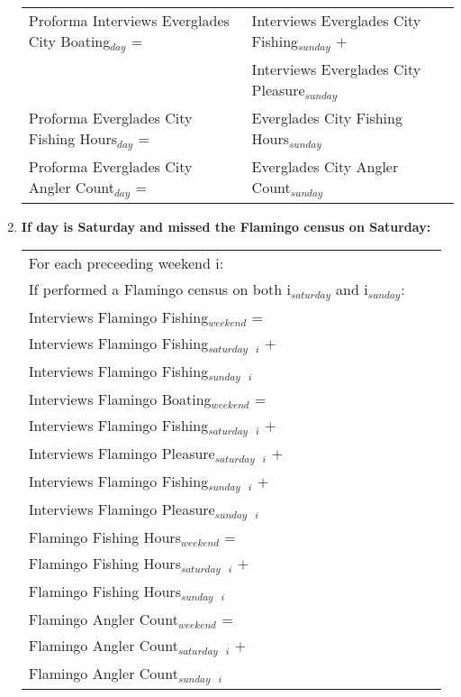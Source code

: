 \documentclass[letterpaper,12pt]{article}
\newcommand{\hspacer}{\hspace*{1cm}}
\begin{document}
\begin{enumerate}
\begin{tabular}{l@{ }l@{ }l}
	Proforma Interviews Everglades City Boating$_{day}$ =
		& Interviews Everglades City Fishing$_{sunday}$ $+$ \\
		& Interviews Everglades City Pleasure$_{sunday}$ \\

	Proforma Everglades City Fishing Hours$_{day}$ =
		& Everglades City Fishing Hours$_{sunday}$ \\

	Proforma Everglades City Angler Count$_{day}$ =
		& Everglades City Angler Count$_{sunday}$ \\
\end{tabular}

\item
\textbf{If day is Saturday and missed the Flamingo census on Saturday:} \\
\begin{tabular}{l@{ }l@{ }l}
	For each preceeding weekend i: \\
\hspacer If performed a Flamingo census on both i$_{saturday}$ and i$_{sunday}$: \\
\hspacer \hspacer Interviews Flamingo Fishing$_{weekend}$ = \\
\hspacer \hspacer \hspacer Interviews Flamingo Fishing$_{saturday}$\ $_{i}$ $+$ \\
\hspacer \hspacer \hspacer Interviews Flamingo Fishing$_{sunday}$\ $_{i}$ \\

\hspacer \hspacer Interviews Flamingo Boating$_{weekend}$ = \\
\hspacer \hspacer \hspacer Interviews Flamingo Fishing$_{saturday}$\ $_{i}$ $+$ \\
\hspacer \hspacer \hspacer Interviews Flamingo Pleasure$_{saturday}$\ $_{i}$ $+$ \\
\hspacer \hspacer \hspacer Interviews Flamingo Fishing$_{sunday}$\ $_{i}$ $+$ \\
\hspacer \hspacer \hspacer Interviews Flamingo Pleasure$_{sunday}$\ $_{i}$ \\

\hspacer \hspacer Flamingo Fishing Hours$_{weekend}$ = \\
\hspacer \hspacer \hspacer Flamingo Fishing Hours$_{saturday}$\ $_{i}$ $+$ \\
\hspacer \hspacer \hspacer Flamingo Fishing Hours$_{sunday}$\ $_{i}$ \\

\hspacer \hspacer Flamingo Angler Count$_{weekend}$ = \\
\hspacer \hspacer \hspacer Flamingo Angler Count$_{saturday}$\ $_{i}$ $+$ \\
\hspacer \hspacer \hspacer Flamingo Angler Count$_{sunday}$\ $_{i}$ \\
\end{tabular}


\end{enumerate}
\end{document}
